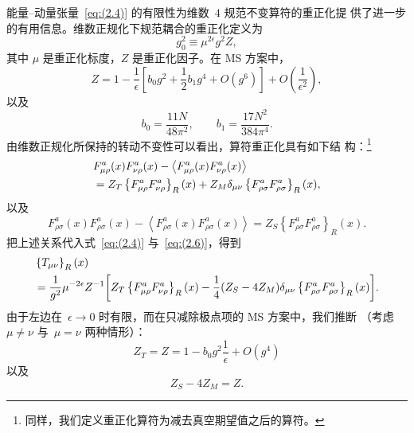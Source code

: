 能量--动量张量~\eqref{eq:(2.4)} 的有限性为维数~$4$ 规范不变算符的重正化提
供了进一步的有用信息。维数正规化下规范耦合的重正化定义为
\begin{equation}
   g_0^2\equiv\mu^{2\epsilon}g^2Z,
\label{eq:(2.7)}
\end{equation}
其中 $\mu$ 是重正化标度，$Z$ 是重正化因子。在 MS 方案中，
\begin{equation}
   Z=1-\frac{1}{\epsilon}
   \left[b_0g^2+\frac{1}{2}b_1g^4+O(g^6)\right]
   +O\left(\frac{1}{\epsilon^2}\right),
\label{eq:(2.8)}
\end{equation}
以及
\begin{equation}
   b_0=\frac{11N}{48\pi^2},\qquad
   b_1=\frac{17N^2}{384\pi^4}.
\label{eq:(2.9)}
\end{equation}
由维数正规化所保持的转动不变性可以看出，算符重正化具有如下结
构：\footnote{同样，我们定义重正化算符为减去真空期望值之后的算符。}
\begin{align}
   &F_{\mu\rho}^a(x)F_{\nu\rho}^a(x)
   -\left\langle F_{\mu\rho}^a(x)F_{\nu\rho}^a(x)\right\rangle
\notag\\
   &=Z_T\left\{F_{\mu\rho}^aF_{\nu\rho}^a\right\}_R(x)
   +Z_M\delta_{\mu\nu}\left\{F_{\rho\sigma}^aF_{\rho\sigma}^a\right\}_R(x),
\label{eq:(2.10)}
\end{align}
以及
\begin{equation}
   F_{\rho\sigma}^a(x)F_{\rho\sigma}^a(x)
   -\left\langle F_{\rho\sigma}^a(x)F_{\rho\sigma}^a(x)\right\rangle
   =Z_S\left\{F_{\rho\sigma}^aF_{\rho\sigma}^a\right\}_R(x).
\label{eq:(2.11)}
\end{equation}
把上述关系代入式~\eqref{eq:(2.4)} 与~\eqref{eq:(2.6)}，得到
\begin{align}
   &\left\{T_{\mu\nu}\right\}_R(x)
\notag\\
   &=\frac{1}{g^2}\mu^{-2\epsilon}
   Z^{-1}\biggl[Z_T\left\{F_{\mu\rho}^aF_{\nu\rho}^a\right\}_R(x)
   -\frac{1}{4}(Z_S-4Z_M)
   \delta_{\mu\nu}\left\{F_{\rho\sigma}^aF_{\rho\sigma}^a\right\}_R(x)
   \biggr].
\label{eq:(2.12)}
\end{align}
由于左边在~$\epsilon\to0$ 时有限，而在只减除极点项的 MS 方案中，我们推断
（考虑 $\mu\neq\nu$ 与~$\mu=\nu$ 两种情形）：
\begin{equation}
   Z_T=Z=1-b_0g^2\frac{1}{\epsilon}+O(g^4)
\label{eq:(2.13)}
\end{equation}
以及
\begin{equation}
   Z_S-4Z_M=Z.
\label{eq:(2.14)}
\end{equation}

